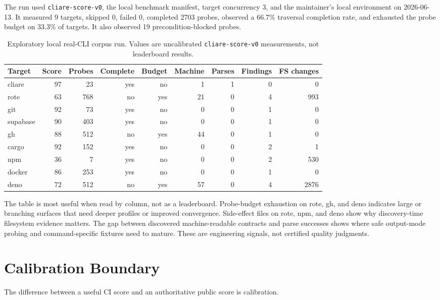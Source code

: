 \documentclass[11pt]{article}
\begin{document}
The run used \texttt{cliare-score-v0}, the local benchmark manifest, target concurrency 3, and the maintainer's local environment on 2026-06-13. It measured 9 targets, skipped 0, failed 0, completed 2703 probes, observed a 66.7\% traversal completion rate, and exhausted the probe budget on 33.3\% of targets. It also observed 19 precondition-blocked probes.

\begin{table}[p]
\centering
\small
\begin{tabular}{@{}lrrrrrrrr@{}}
\toprule
Target & Score & Probes & Complete & Budget & Machine & Parses & Findings & FS changes \\
\midrule
cliare & 97 & 23 & yes & no & 1 & 1 & 0 & 0 \\
rote & 63 & 768 & no & yes & 21 & 0 & 4 & 993 \\
git & 92 & 73 & yes & no & 0 & 0 & 1 & 0 \\
supabase & 90 & 403 & yes & no & 0 & 0 & 1 & 0 \\
gh & 88 & 512 & no & yes & 44 & 0 & 1 & 0 \\
cargo & 92 & 152 & yes & no & 0 & 0 & 2 & 1 \\
npm & 36 & 7 & yes & no & 0 & 0 & 2 & 530 \\
docker & 86 & 253 & yes & no & 0 & 0 & 1 & 0 \\
deno & 72 & 512 & no & yes & 57 & 0 & 4 & 2876 \\
\bottomrule
\end{tabular}
\caption{Exploratory local real-CLI corpus run. Values are uncalibrated \texttt{cliare-score-v0} measurements, not leaderboard results.}
\end{table}

The table is most useful when read by column, not as a leaderboard. Probe-budget exhaustion on rote, gh, and deno indicates large or branching surfaces that need deeper profiles or improved convergence. Side-effect files on rote, npm, and deno show why discovery-time filesystem evidence matters. The gap between discovered machine-readable contracts and parse successes shows where safe output-mode probing and command-specific fixtures need to mature. These are engineering signals, not certified quality judgments.

\section{Calibration Boundary}

The difference between a useful CI score and an authoritative public score is calibration.
\end{document}
